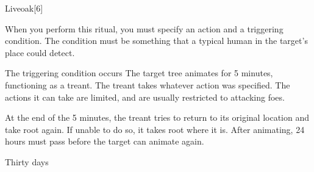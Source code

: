 \begin{spellsection}{Liveoak}[6]
    \begin{spellheader}
    \end{spellheader}
    \begin{spellcontent}
        \begin{spelltargetinginfo}
        \end{spelltargetinginfo}
        \begin{spelleffects}

            \spellspecial When you perform this ritual, you must specify an action and a triggering condition. The condition must be something that a typical human in the target's place could detect.
            \begin{spelltrigger}{The triggering condition occurs}
                \spelleffect The target tree animates for 5 minutes, functioning as a treant. The treant takes whatever action was specified. The actions it can take are limited, and are usually restricted to attacking foes.

                At the end of the 5 minutes, the treant tries to return to its original location and take root again. If unable to do so, it takes root where it is. After animating, 24 hours must pass before the target can animate again.
            \end{spelltrigger}
            \spelldur Thirty days
        \end{spelleffects}
    \end{spellcontent}
    \begin{spellfooter}
    \end{spellfooter}
\end{spellsection}

